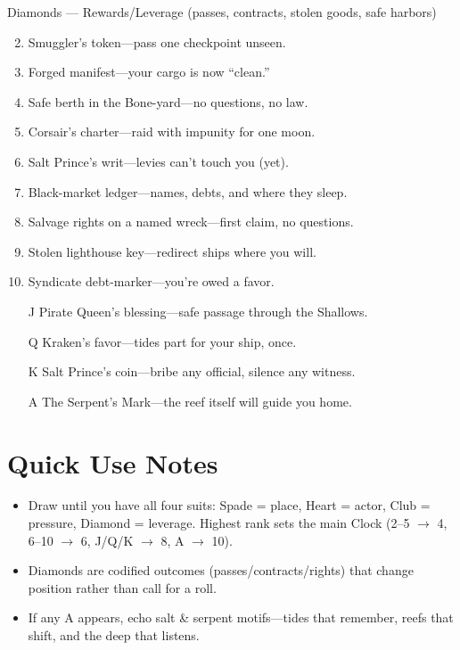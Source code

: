 Diamonds --- Rewards/Leverage (passes, contracts, stolen goods, safe harbors)
\begin{enumerate}
\setcounter{enumi}{1}
\item Smuggler's token---pass one checkpoint unseen.
\item Forged manifest---your cargo is now ``clean.''
\item Safe berth in the Bone-yard---no questions, no law.
\item Corsair's charter---raid with impunity for one moon.
\item Salt Prince's writ---levies can't touch you (yet).
\item Black-market ledger---names, debts, and where they sleep.
\item Salvage rights on a named wreck---first claim, no questions.
\item Stolen lighthouse key---redirect ships where you will.
\item Syndicate debt-marker---you're owed a favor.
\item[J] Pirate Queen's blessing---safe passage through the Shallows.
\item[Q] Kraken's favor---tides part for your ship, once.
\item[K] Salt Prince's coin---bribe any official, silence any witness.
\item[A] The Serpent's Mark---the reef itself will guide you home.
\end{enumerate}

\section*{Quick Use Notes}
\begin{itemize}
\item Draw until you have all four suits: Spade = place, Heart = actor, Club = pressure, Diamond = leverage. Highest rank sets the main Clock (2--5 $\rightarrow$ 4, 6--10 $\rightarrow$ 6, J/Q/K $\rightarrow$ 8, A $\rightarrow$ 10).
\item Diamonds are codified outcomes (passes/contracts/rights) that change position rather than call for a roll.
\item If any A appears, echo salt \& serpent motifs---tides that remember, reefs that shift, and the deep that listens.
\end{itemize}
